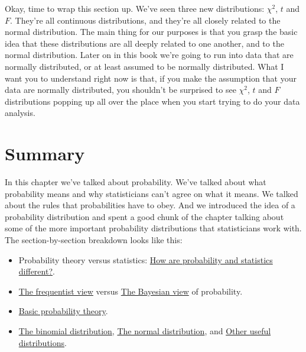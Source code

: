 \documentclass[
  a4paper,
]{book}
\providecommand{\tightlist}{%
  \setlength{\itemsep}{0pt}\setlength{\parskip}{0pt}}\usepackage{longtable,booktabs,array}
\begin{document}
Okay, time to wrap this section up. We've seen three new distributions:
\(\chi^2\), \(t\) and \(F\). They're all continuous distributions, and
they're all closely related to the normal distribution. The main thing
for our purposes is that you grasp the basic idea that these
distributions are all deeply related to one another, and to the normal
distribution. Later on in this book we're going to run into data that
are normally distributed, or at least assumed to be normally
distributed. What I want you to understand right now is that, if you
make the assumption that your data are normally distributed, you
shouldn't be surprised to see \(\chi^2\), \(t\) and \(F\) distributions
popping up all over the place when you start trying to do your data
analysis.

\hypertarget{summary-5}{%
\section{Summary}\label{summary-5}}

In this chapter we've talked about probability. We've talked about what
probability means and why statisticians can't agree on what it means. We
talked about the rules that probabilities have to obey. And we
introduced the idea of a probability distribution and spent a good chunk
of the chapter talking about some of the more important probability
distributions that statisticians work with. The section-by-section
breakdown looks like this:

\begin{itemize}
\tightlist
\item
  Probability theory versus statistics:
  \protect\hyperlink{how-are-probability-and-statistics-different}{How
  are probability and statistics different?}.
\item
  \protect\hyperlink{the-frequentist-view}{The frequentist view} versus
  \protect\hyperlink{the-bayesian-view}{The Bayesian view} of
  probability.
\item
  \protect\hyperlink{basic-probability-theory}{Basic probability
  theory}.
\item
  \protect\hyperlink{sec-The-binomial-distribution}{The binomial
  distribution}, \protect\hyperlink{sec-The-normal-distribution}{The
  normal distribution}, and
  \protect\hyperlink{sec-Other-useful-distributions}{Other useful
  distributions}.
\end{itemize}
\end{document}
